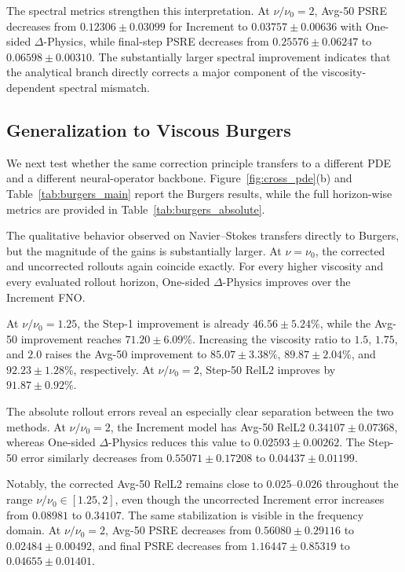 \documentclass[10pt,twocolumn]{article}
\begin{document}
The spectral metrics strengthen this interpretation. At
$\nu/\nu_0=2$, Avg-50 PSRE decreases from
$0.12306\pm0.03099$ for Increment to
$0.03757\pm0.00636$ with One-sided $\Delta$-Physics, while final-step
PSRE decreases from
$0.25576\pm0.06247$ to
$0.06598\pm0.00310$.
The substantially larger spectral improvement indicates that the analytical
branch directly corrects a major component of the viscosity-dependent
spectral mismatch.

\subsection{Generalization to Viscous Burgers}
\label{sec:burgers_results}

We next test whether the same correction principle transfers to a different
PDE and a different neural-operator backbone. Figure~\ref{fig:cross_pde}(b)
and Table~\ref{tab:burgers_main} report the Burgers results, while the full
horizon-wise metrics are provided in
Table~\ref{tab:burgers_absolute}.



The qualitative behavior observed on Navier--Stokes transfers directly to
Burgers, but the magnitude of the gains is substantially larger. At
$\nu=\nu_0$, the corrected and uncorrected rollouts again coincide exactly.
For every higher viscosity and every evaluated rollout horizon,
One-sided $\Delta$-Physics improves over the Increment FNO.

At $\nu/\nu_0=1.25$, the Step-1 improvement is already
$46.56\pm5.24\%$, while the Avg-50 improvement reaches
$71.20\pm6.09\%$. Increasing the viscosity ratio to $1.5$, $1.75$, and
$2.0$ raises the Avg-50 improvement to
$85.07\pm3.38\%$,
$89.87\pm2.04\%$, and
$92.23\pm1.28\%$, respectively.
At $\nu/\nu_0=2$, Step-50 RelL2 improves by
$91.87\pm0.92\%$.

The absolute rollout errors reveal an especially clear separation between the
two methods. At $\nu/\nu_0=2$, the Increment model has Avg-50 RelL2
$0.34107 \pm 0.07368$,
whereas One-sided $\Delta$-Physics reduces this value to
$0.02593 \pm 0.00262$.
The Step-50 error similarly decreases from
$0.55071 \pm 0.17208$
to
$0.04437 \pm 0.01199$.

Notably, the corrected Avg-50 RelL2 remains close to
$0.025$--$0.026$ throughout the range
$\nu/\nu_0\in[1.25,2]$, even though the uncorrected Increment error increases
from $0.08981$ to $0.34107$. The same stabilization is visible in the
frequency domain. At $\nu/\nu_0=2$, Avg-50 PSRE decreases from
$0.56080\pm0.29116$ to $0.02484\pm0.00492$, and final PSRE decreases
from $1.16447\pm0.85319$ to $0.04655\pm0.01401$.
\end{document}
